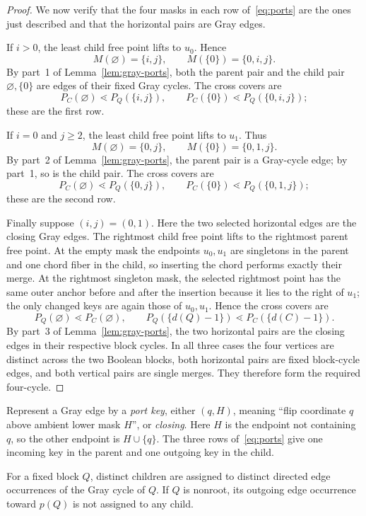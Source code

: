 \documentclass[12pt]{article}
\begin{document}
\begin{proof}
We now verify that the four masks in each row of~\eqref{eq:ports} are the
ones just described and that the horizontal pairs are Gray edges.

If $i>0$, the least child free point lifts to $u_0$.  Hence
\[
 M(\varnothing)=\{i,j\},\qquad
 M(\{0\})=\{0,i,j\}.
\]
By part~1 of Lemma~\ref{lem:gray-ports}, both the parent pair and the child
pair $\varnothing,\{0\}$ are edges of their fixed Gray cycles.  The cross
covers are
\[
 P_C(\varnothing)\lessdot P_Q(\{i,j\}),\qquad
 P_C(\{0\})\lessdot P_Q(\{0,i,j\});
\]
these are the first row.

If $i=0$ and $j\geq2$, the least child free point lifts to $u_1$.  Thus
\[
 M(\varnothing)=\{0,j\},\qquad
 M(\{0\})=\{0,1,j\}.
\]
By part~2 of Lemma~\ref{lem:gray-ports}, the parent pair is a Gray-cycle edge;
by part~1, so is the child pair.  The cross covers are
\[
 P_C(\varnothing)\lessdot P_Q(\{0,j\}),\qquad
 P_C(\{0\})\lessdot P_Q(\{0,1,j\});
\]
these are the second row.

Finally suppose $(i,j)=(0,1)$.  Here the two selected horizontal edges are
the closing Gray edges.  The rightmost child free point lifts to the
rightmost parent free point.  At the empty mask the endpoints $u_0,u_1$ are
singletons in the parent and one chord fiber in the child, so inserting the
chord performs exactly their merge.  At the rightmost singleton mask, the
selected rightmost point has the same outer anchor before and after the
insertion because it lies to the right of $u_1$; the only changed keys are
again those of $u_0,u_1$.  Hence the cross covers are
\[
 P_Q(\varnothing)\lessdot P_C(\varnothing),\qquad
 P_Q(\{d(Q)-1\})\lessdot P_C(\{d(C)-1\}).
\]
By part~3 of Lemma~\ref{lem:gray-ports}, the two horizontal pairs are the
closing edges in their respective block cycles.  In all three cases the four
vertices are distinct across the two Boolean blocks, both horizontal pairs
are fixed block-cycle edges, and both vertical pairs are single merges.  They
therefore form the required four-cycle.
\end{proof}

Represent a Gray edge by a \emph{port key}, either
$(q,H)$, meaning ``flip coordinate $q$ above ambient lower mask $H$'', or
\emph{closing}.  Here $H$ is the endpoint not containing $q$, so the other
endpoint is $H\cup\{q\}$.  The three rows of~\eqref{eq:ports} give one
incoming key in the parent and one outgoing key in the child.

\begin{lemma}\label{lem:port-injection}
For a fixed block $Q$, distinct children are assigned to distinct directed
edge occurrences of the Gray cycle of $Q$.  If $Q$ is nonroot, its outgoing
edge occurrence toward $p(Q)$ is not assigned to any child.
\end{lemma}
\end{document}

